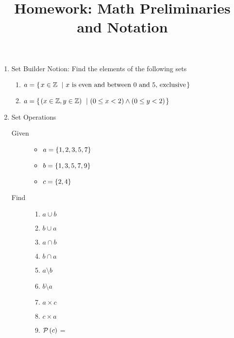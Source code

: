 \documentclass[12pt,letterpaper]{ntdhw}
\title{Homework: Math Preliminaries and Notation}
\author{\coursecode}
\begin{document}
\pagestyle{fancyplain}



\maketitle
\thispagestyle{fancyplain}



\begin{enumerate}
  \item Set Builder Notion: Find the elements of the following sets
  \begin{enumerate}
     \item $a =  \left\{\left.{x \in \mathbb{Z}}\ \right.\left|\ {x \textrm{ is even and between
         0 and 5, exclusive}} \right.\right\}  $


     \item $a =  \left\{\left.{(x \in \mathbb{Z},y \in \mathbb{Z})}\ \right.\left|\ {\left(0 \leq x < 2\right) \land
       \left(0 \leq y < 2\right)} \right.\right\}  $


  \end{enumerate}

  \item Set Operations
  \begin{description}
    \item[Given] \descnl
    \begin{itemize}
      \item $a =  \left\{1,2,3,5,7\right\} $
      \item $b =  \left\{1,3,5,7,9\right\} $
      \item $c =  \left\{2,4\right\} $
    \end{itemize}
    \item[Find] \descnl
    \begin{enumerate}
      \item $a \cup b$
      \item $b \cup a$
      \item $a \cap b$
      \item $b \cap a$
      \item $a \setminus b$
      \item $b \setminus a$
      \item $a \times c$
      \item $c \times a$
      \item $\mathcal{P}\left({c}\right)$ =
      \end{enumerate}
  \end{description}


\end{enumerate}
\end{document}
